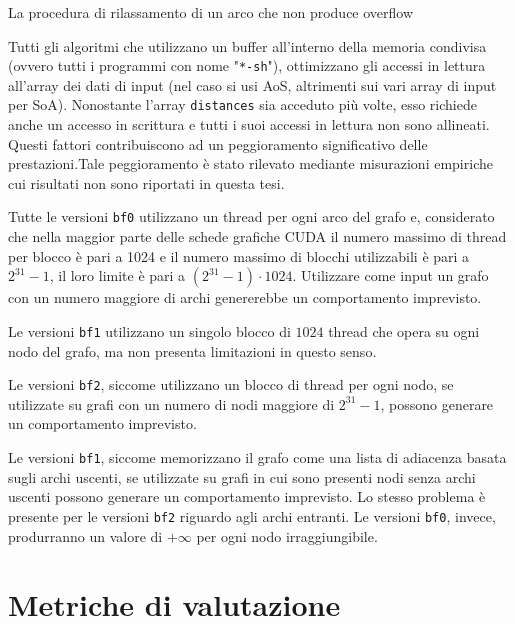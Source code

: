\documentclass[12pt,a4paper,oneside]{book}
\begin{document}
	\begin{algorithm}
		\caption{La procedura di rilassamento di un arco che non produce overflow}
		\label{alg:relax-no-overflow}
	\end{algorithm}

	Tutti gli algoritmi che utilizzano un buffer all'interno della memoria condivisa (ovvero tutti i programmi con nome "\texttt{*-sh}"), ottimizzano gli accessi in lettura all'array dei dati di input (nel caso si usi AoS, altrimenti sui vari array di input per SoA). Nonostante l'array \texttt{distances} sia acceduto più volte, esso richiede anche un accesso in scrittura e tutti i suoi accessi in lettura non sono allineati. Questi fattori contribuiscono ad un peggioramento significativo delle prestazioni.Tale peggioramento è stato rilevato mediante misurazioni empiriche cui risultati non sono riportati in questa tesi.
	
	Tutte le versioni \texttt{bf0} utilizzano un thread per ogni arco del grafo e, considerato che nella maggior parte delle schede grafiche CUDA il numero massimo di thread per blocco è pari a 1024 e il numero massimo di blocchi utilizzabili è pari a $2^{31}-1$\cite{cudaSpecifications}, il loro limite è pari a $(2^{31}-1)\cdot 1024$. Utilizzare come input un grafo con un numero maggiore di archi genererebbe un comportamento imprevisto.
	
	Le versioni \texttt{bf1} utilizzano un singolo blocco di $1024$ thread che opera su ogni nodo del grafo, ma non presenta limitazioni in questo senso.
	
	Le versioni \texttt{bf2}, siccome utilizzano un blocco di thread per ogni nodo, se utilizzate su grafi con un numero di nodi maggiore di $2^{31}-1$, possono generare un comportamento imprevisto.
	
	Le versioni \texttt{bf1}, siccome memorizzano il grafo come una lista di adiacenza basata sugli archi uscenti, se utilizzate su grafi in cui sono presenti nodi senza archi uscenti possono generare un comportamento imprevisto. Lo stesso problema è presente per le versioni \texttt{bf2} riguardo agli archi entranti. Le versioni \texttt{bf0}, invece, produrranno un valore di $+\infty$ per ogni nodo irraggiungibile.
	
	\chapter{Metriche di valutazione}
	\label{chap:metriche}
\end{document}

